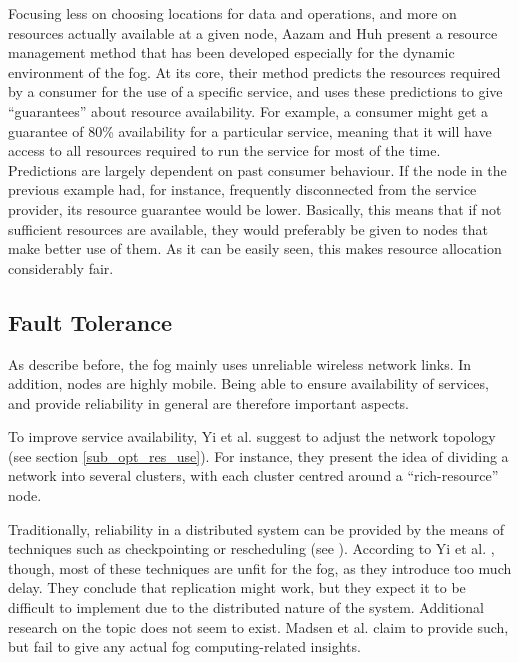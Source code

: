 \documentclass{article}
\begin{document}
Focusing less on choosing locations for data and operations, and more on resources actually available at a given node, Aazam and Huh \cite{aazam2015dynamic} present a resource management method that has been developed especially for the dynamic environment of the fog. At its core, their method predicts the resources required by a consumer for the use of a specific service, and uses these predictions to give ``guarantees'' about resource availability. For example, a consumer might get a guarantee of 80\% availability for a particular service, meaning that it will have access to all resources required to run the service for most of the time. Predictions are largely dependent on past consumer behaviour. If the node in the previous example had, for instance, frequently disconnected from the service provider, its resource guarantee would be lower. Basically, this means that if not sufficient resources are available, they would preferably be given to nodes that make better use of them. As it can be easily seen, this makes resource allocation considerably fair.

\subsection{Fault Tolerance}
As describe before, the fog mainly uses unreliable wireless network links. In addition, nodes are highly mobile. Being able to ensure availability of services, and provide reliability in general are therefore important aspects.

To improve service availability, Yi et al. \cite{yi2015survey} suggest to adjust the network topology (see section \ref{sub_opt_res_use}). For instance, they present the idea of dividing a network into several clusters, with each cluster centred around a ``rich-resource'' node.

Traditionally, reliability in a distributed system can be provided by the means of techniques such as checkpointing or rescheduling (see \cite{tanebaum2013}). According to Yi et al. \cite{yi2015survey}, though, most of these techniques are unfit for the fog, as they introduce too much delay. They conclude that replication might work, but they expect it to be difficult to implement due to the distributed nature of the system. Additional research on the topic does not seem to exist. Madsen et al. \cite{madsen2013reliability} claim to provide such, but fail to give any actual fog computing-related insights.

\end{document}
